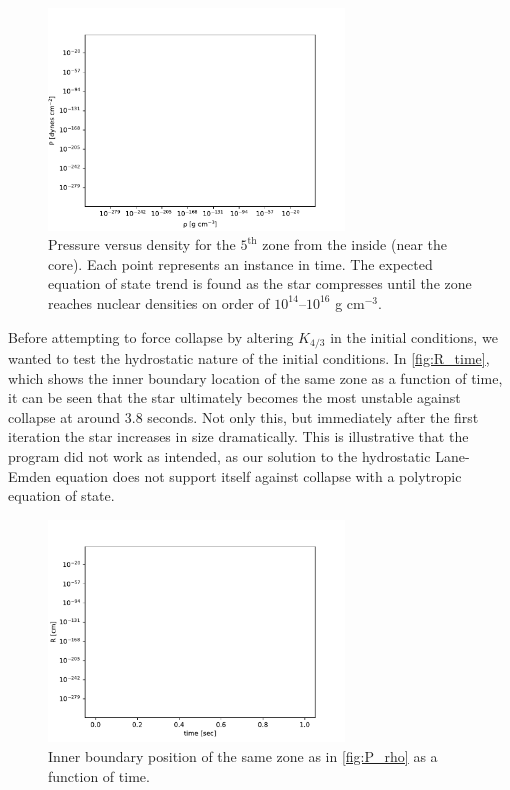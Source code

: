 \documentclass[12pt]{article}
\begin{document}
\begin{figure}[ht]
    \centering
    \includegraphics[width=0.7\textwidth]{P_rho}
    \caption{Pressure versus density for the $5^\text{th}$ zone from the inside (near the core).
             Each point represents an instance in time. The expected equation of state trend is
             found as the star compresses until the zone reaches nuclear densities on order of
             $10^{14}$--$10^{16}$ g cm$^{-3}$.}
    \label{fig:P_rho}
\end{figure}

Before attempting to force collapse by altering $K_{4/3}$ in the initial conditions, we wanted to
test the hydrostatic nature of the initial conditions.
In \autoref{fig:R_time}, which shows the inner boundary location of the same zone as a function of time,
it can be seen that the star ultimately becomes the most unstable against collapse at around 3.8 seconds.
Not only this, but immediately after the first iteration the star increases in size dramatically.
This is illustrative that the program did not work as intended, as our solution to the hydrostatic
Lane-Emden equation does not support itself against collapse with a polytropic equation of state.

\begin{figure}[ht]
    \centering
    \includegraphics[width=0.7\textwidth]{R_time}
    \caption{Inner boundary position of the same zone as in \autoref{fig:P_rho} as a function of time.}
    \label{fig:R_time}
\end{figure}
\end{document}
